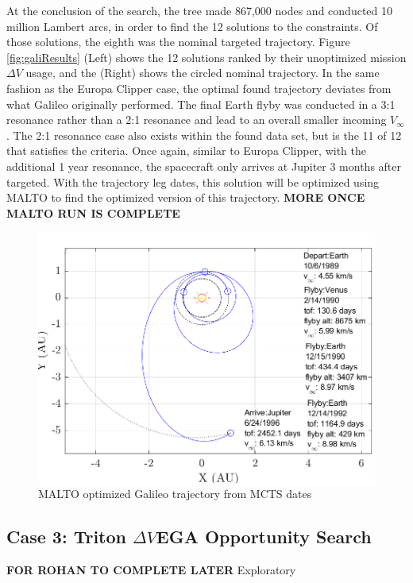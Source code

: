 \documentclass[letterpaper, preprint, paper,11pt]{AAS}	%
\begin{document}
At the conclusion of the search, the tree made 867,000 nodes and conducted 10 million Lambert arcs, in order to find the 12 solutions to the constraints. Of those solutions, the eighth was the nominal targeted trajectory. Figure \ref*{fig:galiResults} (Left) shows the 12 solutions ranked by their unoptimized mission $\Delta V$ usage, and the (Right) shows the circled nominal trajectory. In the same fashion as the Europa Clipper case, the optimal found trajectory deviates from what Galileo originally performed. The final Earth flyby was conducted in a 3:1 resonance rather than a 2:1 resonance and lead to an overall smaller incoming $V_\infty$. The 2:1 resonance case also exists within the found data set, but is the 11 of 12 that satisfies the criteria. Once again, similar to Europa Clipper, with the additional 1 year resonance, the spacecraft only arrives at Jupiter 3 months after targeted. With the trajectory leg dates, this solution will be optimized using MALTO to find the optimized version of this trajectory. \textbf{MORE ONCE MALTO RUN IS COMPLETE}

\begin{figure}[htb]
    \centering
    \includegraphics[width = 5in]{./fig/galileoMalto.png}
    \caption{MALTO optimized Galileo trajectory from MCTS dates}
    \label{fig:galiMalto}
\end{figure}

\subsection{Case 3: Triton $\Delta V$EGA Opportunity Search}
\textbf{FOR ROHAN TO COMPLETE LATER}
\vspace*{3in}
\iffalse
Exploratory
\end{document}
